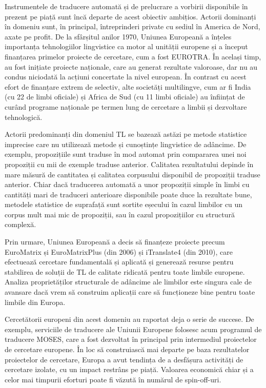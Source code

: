 \begin{multicols}{2}
Instrumentele de traducere automată și de prelucrare a vorbirii disponibile în prezent pe piață sunt încă departe de acest obiectiv ambițios. Actorii dominanți în domeniu sunt, în principal, întreprinderi private cu sediul în America de Nord, axate pe profit. De la sfârșitul anilor 1970, Uniunea Europeană a înțeles importanța tehnologiilor lingvistice ca motor al unității europene și a început finanțarea primelor proiecte de cercetare, cum a fost EUROTRA. În același timp, au fost inițiate proiecte naționale, care au generat rezultate valoroase, dar nu au condus niciodată la acțiuni concertate la nivel european. În contrast cu acest efort de finanțare extrem de selectiv, alte societăți multilingve, cum ar fi India (cu 22 de limbi oficiale) și Africa de Sud (cu 11 limbi oficiale) au înființat de curând programe naționale pe termen lung de cercetare a limbii și dezvoltare tehnologică.


Actorii predominanți din domeniul TL se bazează astăzi pe metode statistice imprecise care nu utilizează metode și cunoștințe lingvistice de adâncime. De exemplu, propozițiile sunt traduse în mod automat prin compararea unei noi propoziții cu mii de exemple traduse anterior. Calitatea rezultatului depinde în mare măsură de cantitatea și calitatea corpusului disponibil de propoziții traduse anterior. Chiar dacă traducerea automată a unor propoziții simple în limbi cu cantități mari de traduceri anterioare disponibile poate duce la rezultate bune, metodele statistice de suprafață sunt sortite eșecului în cazul limbilor cu un corpus mult mai mic de propoziții, sau în cazul propozițiilor cu structură complexă.

Prin urmare, Uniunea Europeană a decis să finanțeze proiecte precum EuroMatrix și EuroMatrixPlus (din 2006) și iTranslate4 (din 2010), care efectuează cercetare fundamentală și aplicată și generează resurse pentru stabilirea de soluții de TL de calitate ridicată pentru toate limbile europene. Analiza proprietăților structurale de adâncime ale limbilor este singura cale de avansare dacă vrem să construim aplicații care să funcționeze bine pentru toate limbile din Europa.

Cercetătorii europeni din acest domeniu au raportat deja o serie de succese. De exemplu, serviciile de traducere ale Uniunii Europene folosesc acum programul de traducere MOSES, care a fost dezvoltat în principal prin intermediul proiectelor de cercetare europene. În loc să construiască mai departe pe baza rezultatelor proiectelor de cercetare, Europa a avut tendința de a desfășura activități de cercetare izolate, cu un impact restrâns pe piață. Valoarea economică chiar și a celor mai timpurii eforturi poate fi văzută în numărul de spin-off-uri.


\end{multicols}

